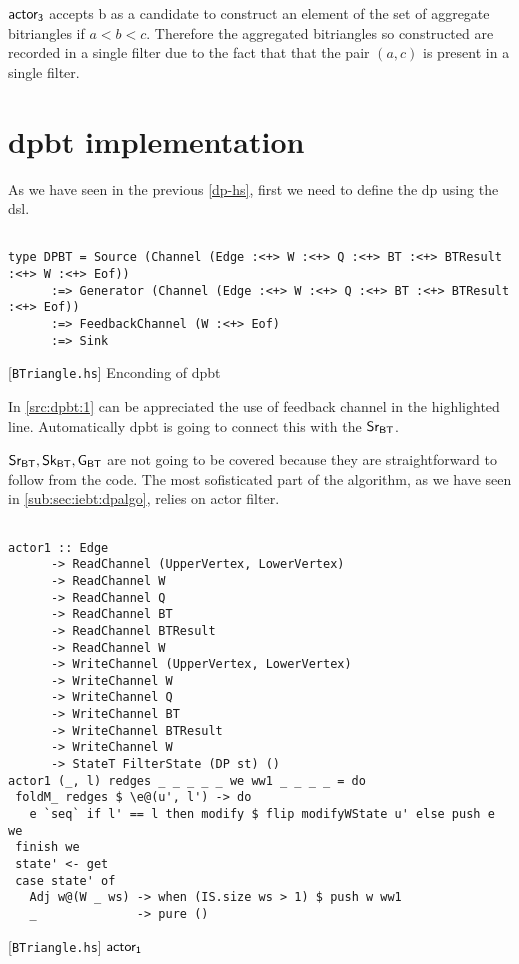 $\mathsf{actor_3}$ accepts b as a candidate to construct an element of the set of aggregate bitriangles if $a < b < c$. Therefore the aggregated bitriangles so constructed are recorded in a single filter due to the fact that that the pair $(a,c)$ is present in a single filter.
\fi

        
 
\section{\acrshort{dpbt} implementation}\label{sec:iebt:hs:imp}
As we have seen in the previous \autoref{dp-hs}, first we need to define the \acrshort{dp} using the \acrshort{dsl}.

\begin{listing}[htp!]
\begin{verbatim}

type DPBT = Source (Channel (Edge :<+> W :<+> Q :<+> BT :<+> BTResult :<+> W :<+> Eof))
      :=> Generator (Channel (Edge :<+> W :<+> Q :<+> BT :<+> BTResult :<+> Eof))
      :=> FeedbackChannel (W :<+> Eof)
      :=> Sink

\end{verbatim}
\caption{[\texttt{BTriangle.hs}] Enconding of \acrshort{dpbt}}
\label{src:dpbt:1}
\end{listing}

In \autoref{src:dpbt:1} can be appreciated the use of feedback channel in the highlighted line. 
Automatically \acrshort{dpbt} is going to connect this with the $\mathsf{Sr_{BT}}$.

$\mathsf{Sr_{BT}}, \mathsf{Sk_{BT}}, \mathsf{G_{BT}}$ are not going to be covered because they are straightforward to follow from the code. 
The most sofisticated part of the algorithm, as we have seen in \autoref{sub:sec:iebt:dpalgo}, relies on actor filter.

\begin{listing}[htp!]
\begin{verbatim}

actor1 :: Edge
      -> ReadChannel (UpperVertex, LowerVertex)
      -> ReadChannel W
      -> ReadChannel Q
      -> ReadChannel BT
      -> ReadChannel BTResult
      -> ReadChannel W
      -> WriteChannel (UpperVertex, LowerVertex)
      -> WriteChannel W
      -> WriteChannel Q
      -> WriteChannel BT
      -> WriteChannel BTResult
      -> WriteChannel W
      -> StateT FilterState (DP st) ()
actor1 (_, l) redges _ _ _ _ _ we ww1 _ _ _ _ = do
 foldM_ redges $ \e@(u', l') -> do
   e `seq` if l' == l then modify $ flip modifyWState u' else push e we
 finish we
 state' <- get
 case state' of
   Adj w@(W _ ws) -> when (IS.size ws > 1) $ push w ww1
   _              -> pure ()

\end{verbatim}
\caption{[\texttt{BTriangle.hs}] $\aaa$}
\label{src:dpbt:2}
\end{listing}

